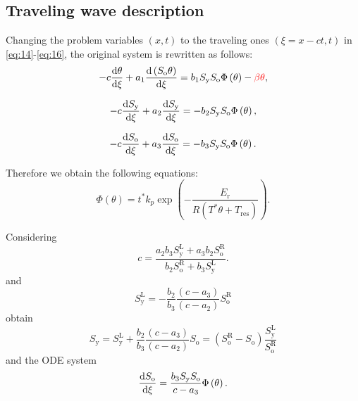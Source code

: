 \subsection{Traveling wave description}

Changing the problem variables $\left(x,t\right)$ to the traveling
ones $\left(\xi=x-ct,t\right)$ in \eqref{eq:14}-\eqref{eq:16},
the original system is rewritten as follows:
\begin{equation}\label{ec4b}
	-c\diff{\theta}{\xi}+
	a_{1}\diff{\left(S_{\text{o}}\theta\right)}{\xi}=
	b_{1}S_{\text{y}}S_{\text{o}}\Phi\left(\theta\right)-
	\textcolor{red}{\beta\theta},
\end{equation}

\begin{equation}\label{ec5b}
	-c\diff{S_{\text{y}}}{\xi}+
	a_{2}
	\diff{S_{\text{y}}}{\xi}=
	-b_{2}S_{\text{y}}S_{\text{o}}\Phi\left(\theta\right),
\end{equation}

\begin{equation}\label{ec6b}
	-c
	\diff{S_{\text{o}}}{\xi}+
	a_{3}
	\diff{S_{\text{o}}}{\xi}=
	-b_{3}S_{\text{y}}S_{\text{o}}\Phi\left(\theta\right).
\end{equation}

Therefore we obtain the following equations:
\begin{equation}
	\label{PHI}
	\Phi\left(\theta\right)=
	t^{\ast}k_{p}
	\exp
	\left(
	-\frac{E_{\text{r}}}{R\left(T^{\ast}\theta+T_{\text{res}}\right)}
	\right).
\end{equation}

Considering
\begin{equation}
	\label{ec36c}
	c=
	\frac{a_{2}b_{3}S_{\text{y}}^{\text{L}} + a_{3} b_{2} S_{\text{o}}^{\text{R}}}{b_{2} S_{\text{o}}^{\text{R}} + b_{3} S_{\text{y}}^{\text{L}}}.
\end{equation}
and
\begin{equation}
	\label{SyL}
	S_{\text{y}}^{\text{L}}=
	-\frac{b_{2}}{b_{3}}
	\frac{\left(c-a_{3}\right)}{\left(c-a_{2}\right)}S_{\text{o}}^{\text{R}}
\end{equation}
obtain
\begin{equation}
	\label{Sy}
	S_{\text{y}}=
	S_{\text{y}}^{\text{L}}+
	\frac{b_{2}}{b_{3}}
	\frac{\left(c - a_{3}\right)}{\left(c - a_{2}\right)}S_{\text{o}}=
	\left(S_{\text{o}}^{\text{R}}-S_{\text{o}}\right)
	\frac{S_{\text{y}}^{\text{L}}}{S_{\text{o}}^{\text{R}}}
\end{equation}
and the ODE system
\begin{equation}
	\label{ec38c}
	\diff{S_{\text{o}}}{\xi}=
	\frac{b_{3}S_{\text{y}}S_{\text{o}}}{c-a_{3}}
	\Phi\left(\theta\right).
\end{equation}


